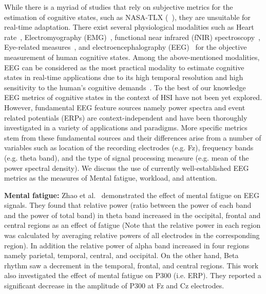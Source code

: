 \documentclass[journal]{IEEEtran}
\begin{document}
While there is a myriad of studies that rely on subjective metrics for  the estimation of cognitive states, such as NASA-TLX (~\cite{hart1988development}), they are unsuitable for real-time adaptation. There exist several physiological modalities such as Heart rate~\cite{borghini2014measuring}, Electromyography (EMG)~\cite{fallahi2016effects}, functional near infrared (fNIR) spectroscopy~\cite{ayaz2012optical}, Eye-related measures~\cite{marquart2015review}, and electroencephalography (EEG)~\cite{borghini2014measuring} for the objective measurement of human cognitive states. Among the above-mentioned modalities, EEG can be considered as the most practical modality to estimate cognitive states in real-time applications due to its high temporal resolution and high sensitivity to the human\textquoteright s cognitive demands~\cite{borghini2014measuring}. To the best of our knowledge EEG metrics of cognitive states in the context of HSI have not been yet explored. However, fundamental EEG feature sources namely power spectra and event related potentials (ERPs) are context-independent and have been thoroughly investigated in a variety of applications and paradigms. More specific metrics stem from these fundamental sources and their differences arise from a number of variables such as location of  the recording electrodes (e.g. Fz), frequency bands (e.g. theta band), and the type of signal processing measure (e.g. mean of the power spectral density). We discuss the use of currently well-established EEG metrics as the measures of Mental fatigue, workload, and attention.    

\textbf{Mental fatigue:} Zhao et al.~\cite{zhao2012electroencephalogram} demonstrated the effect of mental fatigue on EEG signals. They found that relative power (ratio between the power of each band and the power of total band) in theta band increased in the occipital, frontal and central regions as an effect of fatigue (Note that the relative power in each region was calculated by averaging relative powers of all electrodes in the corresponding region). In addition the relative power of alpha band increased in four regions namely parietal, temporal, central, and occipital. On the other hand, Beta rhythm saw a decrement in the temporal, frontal, and central regions. This work also investigated the effect of mental fatigue on P300 (i.e. ERP). They reported a significant decrease in the amplitude of P300 at Fz and Cz electrodes.
\end{document}
